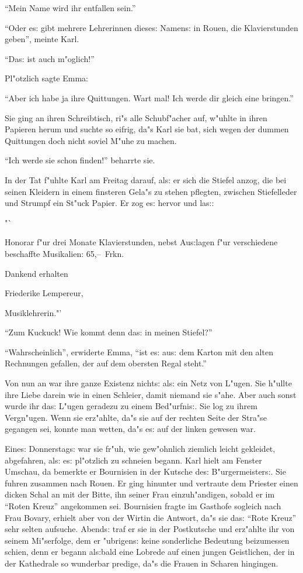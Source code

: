 \documentclass[oneside,12pt]{book}
\newcommand{\s}{s:}%
\begin{document}
"`Mein Name wird ihr entfallen sein."'

"`Oder e{\s} gibt mehrere Lehrerinnen diese{\s} Namen{\s} in
Rouen, die Klavierstunden geben"', meinte Karl.

"`Da{\s} ist auch m"oglich!"'

Pl"otzlich sagte Emma:

"`Aber ich habe ja ihre Quittungen. Wart mal! Ich werde dir gleich
eine bringen."'

Sie ging an ihren Schreibtisch, ri"s alle Schubf"acher auf,
w"uhlte in ihren Papieren herum und suchte so eifrig, da"s Karl
sie bat, sich wegen der dummen Quittungen doch nicht soviel M"uhe
zu machen.

"`Ich werde sie schon finden!"' beharrte sie.

In der Tat f"uhlte Karl am Freitag darauf, al{\s} er sich die
Stiefel anzog, die bei seinen Kleidern in einem finsteren Gela"s
zu stehen pflegten, zwischen Stiefelleder und Strumpf ein St"uck
Papier. Er zog e{\s} hervor und la{\s}:

\begin{center}
"`
\end{center}
Honorar f"ur drei Monate Klavierstunden, nebst Au{\s}lagen f"ur
verschiedene beschaffte Musikalien: 65,--~Frkn.

\hfill Dankend erhalten \hspace{4em}

\hfill Friederike Lempereur,

\hfill Musiklehrerin."'
\bigskip

"`Zum Kuckuck! Wie kommt denn da{\s} in meinen Stiefel?"'

"`Wahrscheinlich"', erwiderte Emma, "`ist e{\s} au{\s} dem Karton
mit den alten Rechnungen gefallen, der auf dem obersten Regal
steht."'

Von nun an war ihre ganze Existenz nicht{\s} al{\s} ein Netz von
L"ugen. Sie h"ullte ihre Liebe darein wie in einen Schleier, damit
niemand sie s"ahe. Aber auch sonst wurde ihr da{\s} L"ugen
geradezu zu einem Bed"urfni{\s}. Sie log zu ihrem Vergn"ugen. Wenn
sie erz"ahlte, da"s sie auf der rechten Seite der Stra"se gegangen
sei, konnte man wetten, da"s e{\s} auf der linken gewesen war.

Eine{\s} Donnerstag{\s} war sie fr"uh, wie gew"ohnlich ziemlich
leicht gekleidet, abgefahren, al{\s} e{\s} pl"otzlich zu schneien
begann. Karl hielt am Fenster Umschau, da bemerkte er Bournisien
in der Kutsche de{\s} B"urgermeister{\s}. Sie fuhren zusammen nach
Rouen. Er ging hinunter und vertraute dem Priester einen dicken
Schal an mit der Bitte, ihn seiner Frau einzuh"andigen, sobald er
im "`Roten Kreuz"' angekommen sei. Bournisien fragte im Gasthofe
sogleich nach Frau Bovary, erhielt aber von der Wirtin die
Antwort, da"s sie da{\s} "`Rote Kreuz"' sehr selten aufsuche.
Abend{\s} traf er sie in der Postkutsche und erz"ahlte ihr von
seinem Mi"serfolge, dem er "ubrigen{\s} keine sonderliche
Bedeutung beizumessen schien, denn er begann al{\s}bald eine
Lobrede auf einen jungen Geistlichen, der in der Kathedrale so
wunderbar predige, da"s die Frauen in Scharen hingingen.
\end{document}
